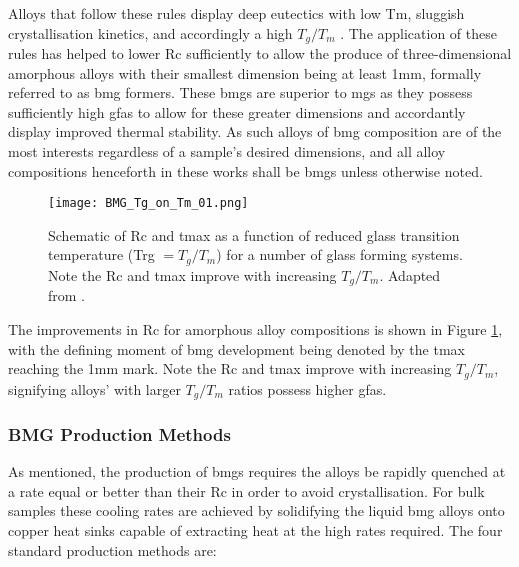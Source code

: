 \documentclass[a4paper,12pt,oneside]{report}%
\begin{document}
Alloys that follow these rules display deep eutectics with low \gls{Tm}, sluggish crystallisation kinetics, and accordingly a high $T_{g}/T_{m}$ \cite{Inoue2000, Schroers2010}. The application of these rules has helped to lower \gls{Rc} sufficiently to allow the produce of three-dimensional amorphous alloys with their smallest dimension being at least 1mm, formally referred to as \gls{bmg} formers. These \glspl{bmg} are superior to \glspl{mg} as they possess sufficiently high \glspl{gfa} to allow for these greater dimensions and accordantly display improved thermal stability. As such alloys of \gls{bmg} composition are of the most interests regardless of a sample's desired dimensions, and all alloy compositions henceforth in these works shall be \glspl{bmg} unless otherwise noted. 

\begin{figure}[htb]
	\centering
	\texttt{[image: BMG\_Tg\_on\_Tm\_01.png]}
	\caption[Schematic of \acrfull{Rc} and \acrfull{tmax} as a function of reduced glass transition temperature (\acrshort{Trg} $= T_{g}/T_{m}$) for a number of glass forming systems. Note the \acrshort{Rc} and \acrshort{tmax} improve with increasing $T_{g}/T_{m}$.]{Schematic of \acrfull{Rc} and \acrfull{tmax} as a function of reduced glass transition temperature (\acrshort{Trg} $= T_{g}/T_{m}$) for a number of glass forming systems. Note the \acrshort{Rc} and \acrshort{tmax} improve with increasing $T_{g}/T_{m}$. Adapted from \cite{Trexler2010}.}
	\label{fig:BMGRc}
\end{figure}

The improvements in \gls{Rc} for amorphous alloy compositions is shown in Figure \ref{fig:BMGRc}, with the defining moment of \gls{bmg} development being denoted by the \gls{tmax} reaching the 1mm mark. Note the \gls{Rc} and \gls{tmax} improve with increasing $T_{g}/T_{m}$, signifying alloys' with larger $T_{g}/T_{m}$ ratios possess higher \glspl{gfa}. 

\subsubsection{BMG Production Methods}
As mentioned, the production of \glspl{bmg} requires the alloys be rapidly quenched at a rate equal or better than their \gls{Rc} in order to avoid crystallisation. For bulk samples these cooling rates are achieved by solidifying the liquid \gls{bmg} alloys onto copper heat sinks capable of extracting heat at the high rates required. The four standard production methods are: 
\end{document}
